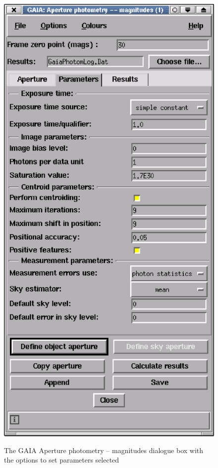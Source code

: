 \documentclass[twoside,11pt]{article}
\begin{document}
\begin{enumerate}
\begin{figure}[htbp]
     \includegraphics[totalheight=5.5in]{sc6_gaia4.ps}
     \begin{quote}
     \caption[Setting parameters in the {\sf Aperture photometry --
      magnitudes} dialogue box]
      {The GAIA {\sf Aperture photometry -- magnitudes} dialogue box with
      the options to set parameters selected
     \label{g5} }
     \end{quote}
  \end{figure} 


\end{enumerate}
\end{document}

